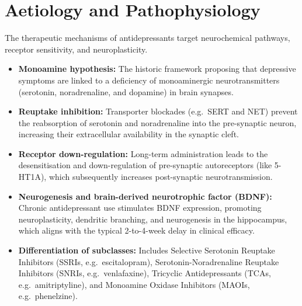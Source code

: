 \section*{Aetiology and Pathophysiology}
The therapeutic mechanisms of antidepressants target neurochemical pathways, receptor sensitivity, and neuroplasticity.
\begin{itemize}
    \item \textbf{Monoamine hypothesis:} The historic framework proposing that depressive symptoms are linked to a deficiency of monoaminergic neurotransmitters (serotonin, noradrenaline, and dopamine) in brain synapses.
    \item \textbf{Reuptake inhibition:} Transporter blockades (e.g.\ SERT and NET) prevent the reabsorption of serotonin and noradrenaline into the pre-synaptic neuron, increasing their extracellular availability in the synaptic cleft.
    \item \textbf{Receptor down-regulation:} Long-term administration leads to the desensitisation and down-regulation of pre-synaptic autoreceptors (like 5-HT1A), which subsequently increases post-synaptic neurotransmission.
    \item \textbf{Neurogenesis and brain-derived neurotrophic factor (BDNF):} Chronic antidepressant use stimulates BDNF expression, promoting neuroplasticity, dendritic branching, and neurogenesis in the hippocampus, which aligns with the typical 2-to-4-week delay in clinical efficacy.
    \item \textbf{Differentiation of subclasses:} Includes Selective Serotonin Reuptake Inhibitors (SSRIs, e.g.\ escitalopram), Serotonin-Noradrenaline Reuptake Inhibitors (SNRIs, e.g.\ venlafaxine), Tricyclic Antidepressants (TCAs, e.g.\ amitriptyline), and Monoamine Oxidase Inhibitors (MAOIs, e.g.\ phenelzine).
\end{itemize}

